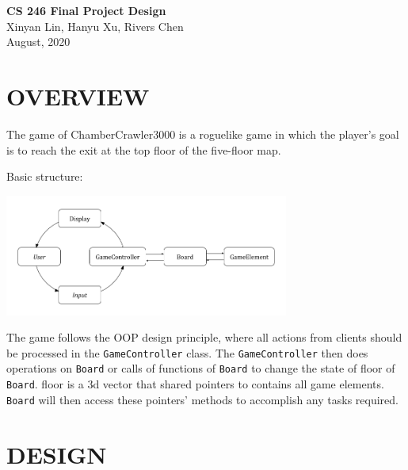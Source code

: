 \documentclass[11pt]{article}
\theoremstyle{plain} \newtheorem{theorem*}{Theorem}[subsection]
\begin{document}
\begin{center}
{\LARGE \textbf{CS 246 Final Project Design}}\\
\vspace{0.15 in}
Xinyan Lin, Hanyu Xu, Rivers Chen\\ 
\vspace{0.07 in} August, 2020 
\end{center}

\vspace{0.3 in} 
\section{OVERVIEW} 
The game of ChamberCrawler3000 is a roguelike game in which the player’s goal
is to reach the exit at the top floor of the five-floor map.  

Basic structure:
\begin{center}
\includegraphics[width=0.7\textwidth]{Flow Chart Cutted.png}
\end{center}

The game follows the OOP design principle, where all actions from clients
should be processed in the \texttt{GameController} class. The 
\texttt{GameController} then does operations on \texttt{Board} or calls 
of functions of \texttt{Board} to change the state of \textsf{floor} of
\texttt{Board}. \textsf{floor} is a 3d vector that shared pointers to
contains all game elements. \texttt{Board} will then access these pointers'
methods to accomplish any tasks required.\\



\section{DESIGN} 
\end{document}
